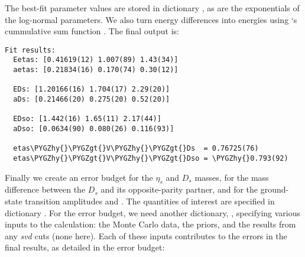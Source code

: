 \documentclass[letterpaper,10pt,english]{sphinxmanual}
\def\PYGZgt{\char`\>}
\def\PYGZhy{\char`\-}
\begin{document}
The best-fit parameter values are stored in dictionary ,
as are the exponentials of the log-normal parameters.
We also turn energy differences into energies using `s cummulative
sum function . The final output is:

\begin{Verbatim}[commandchars=\\\{\}]
Fit results:
  Eetas: [0.41619(12) 1.007(89) 1.43(34)]
  aetas: [0.21834(16) 0.170(74) 0.30(12)]

  EDs: [1.20166(16) 1.704(17) 2.29(20)]
  aDs: [0.21466(20) 0.275(20) 0.52(20)]

  EDso: [1.442(16) 1.65(11) 2.17(44)]
  aDso: [0.0634(90) 0.080(26) 0.116(93)]

  etas\PYGZhy{}\PYGZgt{}V\PYGZhy{}\PYGZgt{}Ds  = 0.76725(76)
  etas\PYGZhy{}\PYGZgt{}V\PYGZhy{}\PYGZgt{}Dso = \PYGZhy{}0.793(92)
\end{Verbatim}

Finally we  create an error budget for the \(\eta_s\)
and \(D_s\) masses, for the mass difference between the \(D_s\) and its
opposite-parity partner, and for the ground-state transition amplitudes
 and . The quantities of interest are specified in dictionary
. For the error budget, we need another dictionary, ,
specifying various inputs to the calculation: the Monte Carlo data, the
priors, and the results from any \emph{svd} cuts (none here). Each of these inputs
contributes to the errors in the final results, as detailed in the
error budget:
\end{document}

